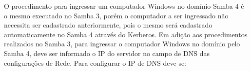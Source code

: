 O procedimento para ingressar um computador Windows no domínio Samba 4 é o mesmo executado no Samba 3, porém o computador a ser ingressado não necessita ser cadastrado anteriormente, pois o mesmo será cadastrado automaticamente no Samba 4 através do Kerberos.
Em adição aos procedimentos realizados no Samba 3, para ingressar o computador Windows no domínio pelo Samba 4, deve ser informado o IP do servidor no campo de DNS das configurações de Rede. Para configurar o IP de DNS deve-se:
